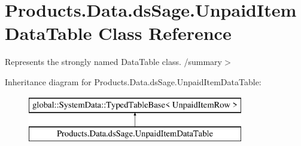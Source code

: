 \hypertarget{class_products_1_1_data_1_1ds_sage_1_1_unpaid_item_data_table}{}\section{Products.\+Data.\+ds\+Sage.\+Unpaid\+Item\+Data\+Table Class Reference}
\label{class_products_1_1_data_1_1ds_sage_1_1_unpaid_item_data_table}


Represents the strongly named Data\+Table class. /summary$>$  


Inheritance diagram for Products.\+Data.\+ds\+Sage.\+Unpaid\+Item\+Data\+Table\+:\begin{figure}[H]
\begin{center}
\leavevmode
\includegraphics[height=2.000000cm]{class_products_1_1_data_1_1ds_sage_1_1_unpaid_item_data_table}
\end{center}
\end{figure}
